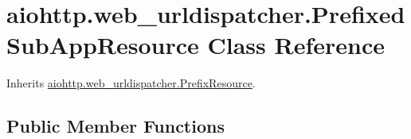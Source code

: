 \hypertarget{classaiohttp_1_1web__urldispatcher_1_1_prefixed_sub_app_resource}{}\section{aiohttp.\+web\+\_\+urldispatcher.\+Prefixed\+Sub\+App\+Resource Class Reference}
\label{classaiohttp_1_1web__urldispatcher_1_1_prefixed_sub_app_resource}


Inherits \hyperlink{classaiohttp_1_1web__urldispatcher_1_1_prefix_resource}{aiohttp.\+web\+\_\+urldispatcher.\+Prefix\+Resource}.

\subsection*{Public Member Functions}
